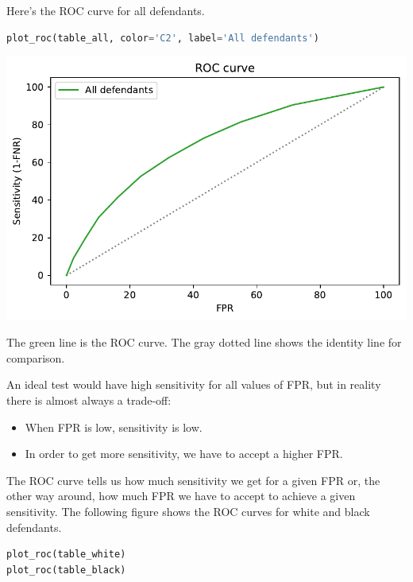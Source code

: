 Here's the ROC curve for all defendants.

\begin{lstlisting}[language=Python]
plot_roc(table_all, color='C2', label='All defendants')
\end{lstlisting}

\begin{center}
\includegraphics[scale=0.75]{chapters/02_calibration_files/02_calibration_64_0.pdf}
\end{center}

The green line is the ROC curve. The gray dotted line shows the identity
line for comparison.

An ideal test would have high sensitivity for all values of FPR, but in
reality there is almost always a trade-off:

\begin{itemize}
\item
  When FPR is low, sensitivity is low.
\item
  In order to get more sensitivity, we have to accept a higher FPR.
\end{itemize}

The ROC curve tells us how much sensitivity we get for a given FPR or,
the other way around, how much FPR we have to accept to achieve a given
sensitivity. The following figure shows the ROC curves for white and
black defendants.

\begin{lstlisting}[language=Python]
plot_roc(table_white)
plot_roc(table_black)
\end{lstlisting}

